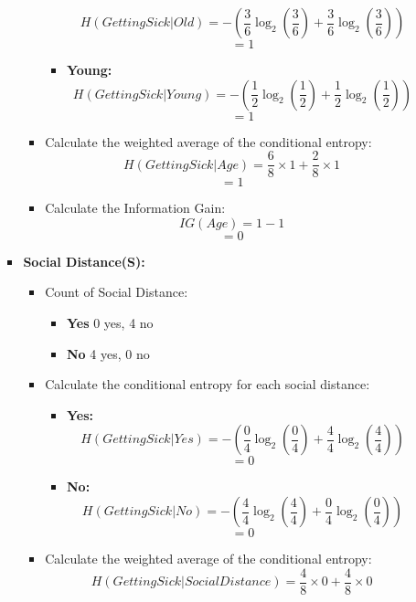 \documentclass{article}
\begin{document}
\begin{enumerate}[label=\alph*)]
\begin{itemize}
\begin{itemize}
\begin{itemize}
\begin{itemize}
\[               H(Getting Sick | Old) = -(\frac{3}{6} \log_2(\frac{3}{6}) + \frac{3}{6} \log_2(\frac{3}{6}))
               \]
               \[
               = 1
               \]
               \item \textbf{Young:}
               \[
               H(Getting Sick | Young) = -(\frac{1}{2} \log_2(\frac{1}{2}) + \frac{1}{2} \log_2(\frac{1}{2}))
               \]
               \[
               = 1
               \]
            \end{itemize}
            \item Calculate the weighted average of the conditional entropy:
            \[
            H(Getting Sick | Age) = \frac{6}{8} \times 1 + \frac{2}{8} \times 1
            \]
            \[
            = 1
            \]
            \item Calculate the Information Gain:
            \[
            IG(Age) = 1 - 1
            \]
            \[
            = 0
            \]
         \end{itemize}
         \item \textbf{Social Distance(S):}
         \begin{itemize}
            \item Count of Social Distance:
            \begin{itemize}
               \item \textbf{Yes} 0 yes, 4 no
               \item \textbf{No} 4 yes, 0 no
            \end{itemize}
            \item Calculate the conditional entropy for each social distance:
            \begin{itemize}
               \item \textbf{Yes:}
               \[
               H(Getting Sick | Yes) = -(\frac{0}{4} \log_2(\frac{0}{4}) + \frac{4}{4} \log_2(\frac{4}{4}))
               \]
               \[
               = 0
               \]
               \item \textbf{No:}
               \[
               H(Getting Sick | No) = -(\frac{4}{4} \log_2(\frac{4}{4}) + \frac{0}{4} \log_2(\frac{0}{4}))
               \]
               \[
               = 0
               \]
            \end{itemize}
            \item Calculate the weighted average of the conditional entropy:
            \[
            H(Getting Sick | Social Distance) = \frac{4}{8} \times 0 + \frac{4}{8} \times 0
\]
\end{itemize}
\end{itemize}
\end{itemize}
\end{enumerate}
\end{document}
